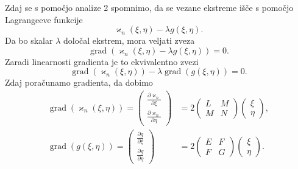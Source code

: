     Zdaj se s pomočjo analize 2 spomnimo, da se vezane ekstreme išče s pomočjo Lagrangeeve funkcije \begin{equation*}
      \varkappa_n(\xi, \eta) - \lambda g(\xi, \eta).
    \end{equation*}  
    Da bo skalar $\lambda$ določal ekstrem, mora veljati zveza \begin{equation*}
      \operatorname{grad}(\varkappa_n(\xi, \eta) - \lambda g(\xi, \eta)) = 0.
    \end{equation*}  
    Zaradi linearnosti gradienta je to ekvivalentno zvezi \begin{equation*}
        \operatorname{grad}(\varkappa_n(\xi, \eta)) - \lambda \operatorname{grad}(g(\xi, \eta)) = 0.
    \end{equation*}
    Zdaj poračunamo gradienta, da dobimo \begin{align*}
        \operatorname{grad}(\varkappa_n(\xi, \eta)) = \begin{pmatrix}
            \frac{ \partial \varkappa_n }{ \partial \xi } \\
            \frac{ \partial \varkappa_n }{ \partial \eta }
        \end{pmatrix}  &= 2 \begin{pmatrix}
        L & M \\
        M & N
        \end{pmatrix}  \begin{pmatrix}
            \xi \\
            \eta
        \end{pmatrix},  \\
        \operatorname{grad}(g(\xi, \eta)) = \begin{pmatrix}
            \frac{ \partial g }{ \partial \xi } \\
            \frac{ \partial g }{ \partial \eta }
        \end{pmatrix}  &= 2 \begin{pmatrix}
        E & F \\
        F & G
        \end{pmatrix}  \begin{pmatrix}
            \xi \\
            \eta
        \end{pmatrix}.
    \end{align*}

